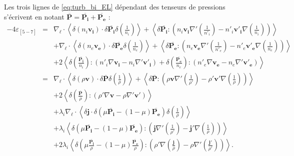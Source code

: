 Les trois lignes de \eqref{eq:turb_bi_EL} dépendant des tenseurs de pressions s'écrivent en notant  $\overline{\boldsymbol{P}} = \overline{\boldsymbol{P_i}}+\overline{\boldsymbol{P_e}}$ :
\begin{eqnarray}%
  - 4  \varepsilon_{[5-7]} 
   &=& \nabla_{\boldsymbol{\ell}} \cdot\left<  \delta \left(n_i \boldsymbol{v_i}\right) \cdot \delta \overline{\boldsymbol{P_i}} \delta \left(\frac{1}{n_i}\right)\right> + \left<\delta \overline{\boldsymbol{P_i}} : \left(n_i \boldsymbol{v_i}  \nabla' \left(\frac{1}{n'_i}\right) - n'_i \boldsymbol{v'_i} \nabla \left(\frac{1}{n_i}\right)\right)\right>  \nonumber\\ %
  &&+ \nabla_{\boldsymbol{\ell}} \cdot\left<  \delta \left(n_e \boldsymbol{v_e}\right) \cdot \delta \overline{\boldsymbol{P_e}} \delta \left(\frac{1}{n_e}\right)\right> + \left<\delta \overline{\boldsymbol{P_e}} : \left(n_e \boldsymbol{v_e}  \nabla' \left(\frac{1}{n'_e}\right) - n'_e \boldsymbol{v'_e} \nabla \left(\frac{1}{n_e}\right)\right)\right> \nonumber \\ %
  &&+ 2 \left<\delta \left(\frac{\overline{\boldsymbol{P_i}}}{n_i}\right) : \left(n'_i \nabla\boldsymbol{v_i} - n_i \nabla' \boldsymbol{v'_i}\right) +\delta \left(\frac{\overline{\boldsymbol{P_e}}}{n_e}\right) : \left(n'_e \nabla\boldsymbol{v_e} - n_e \nabla' \boldsymbol{v'_e}\right) \right>  \nonumber\\ %
 \label{eq:turb_bi_EL5-7} &=& \nabla_{\boldsymbol{\ell}} \cdot\left<  \delta \left(\rho \boldsymbol{v}\right) \cdot \delta \overline{\boldsymbol{P}} \delta \left(\frac{1}{\rho}\right)\right> + \left<\delta \overline{\boldsymbol{P}} : \left(\rho \boldsymbol{v}  \nabla' \left(\frac{1}{\rho'}\right) - \rho' \boldsymbol{v'} \nabla \left(\frac{1}{\rho}\right)\right)\right> \nonumber\\%
  &&+ 2 \left<\delta \left(\frac{\overline{\boldsymbol{P}}}{\rho}\right) : \left(\rho' \nabla \boldsymbol{v}- \rho \nabla' \boldsymbol{v'} \right) \right>  \nonumber\\
  &&+ \lambda_i  \nabla_{\boldsymbol{\ell}} \cdot\left<  \delta \boldsymbol{j} \cdot \delta \left(\mu\overline{\boldsymbol{P_i}}-\left(1-\mu\right) \overline{\boldsymbol{P_e}}\right)\delta \left(\frac{1}{\rho}\right)\right> \nonumber\\
  &&+ \lambda_i \left<\delta \left(\mu\overline{\boldsymbol{P_i}}-\left(1-\mu\right) \overline{\boldsymbol{P_e}}\right) : \left(\boldsymbol{j}  \nabla' \left(\frac{1}{\rho'}\right) - \boldsymbol{j'} \nabla \left(\frac{1}{\rho}\right)\right)\right> \nonumber \\%
  &&+ 2\lambda_i\left<\delta \left(\mu\frac{\overline{\boldsymbol{P_i}}}{\rho}-\left(1-\mu\right)\frac{\overline{\boldsymbol{P_e}}}{\rho}\right) : \left(\rho' \nabla \left(  \frac{\boldsymbol{j}}{\rho}\right) - \rho \nabla' \left( \frac{\boldsymbol{j'}}{\rho'}\right) \right)\right> .
  \end{eqnarray} %
